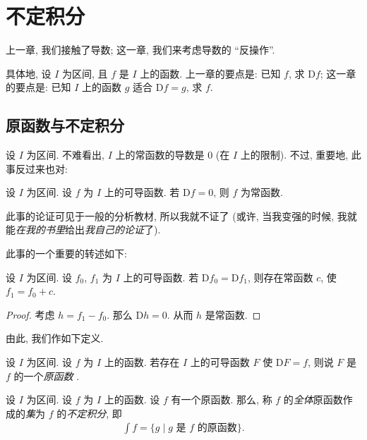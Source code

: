 \chapter{不定积分}

上一章, 我们接触了导数;
这一章, 我们来考虑导数的 ``反操作''.

具体地, 设 $I$ 为区间, 且 $f$ 是 $I$ 上的函数.
上一章的要点是:
已知 $f$, 求 $\mathrm{D}f$;
这一章的要点是:
已知 $I$ 上的函数 $g$ 适合 $\mathrm{D}f = g$, 求 $f$.

\section{原函数与不定积分}

设 $I$ 为区间.
不难看出, $I$ 上的常函数的导数是 $0$ (在 $I$ 上的限制).
不过, 重要地, 此事反过来也对:

\begin{theorem}
    设 $I$ 为区间.
    设 $f$ 为 $I$ 上的可导函数.
    若 $\mathrm{D}f = 0$, 则 $f$ 为常函数.
\end{theorem}

此事的论证可见于一般的分析教材, 所以我就不证了
(或许, 当我变强的时候,
我就能\emph{在我的书里}给出\emph{我自己的论证}了).

此事的一个重要的转述如下:

\begin{theorem}
    设 $I$ 为区间.
    设 $f_0$, $f_1$ 为 $I$ 上的可导函数.
    若 $\mathrm{D}{f_0} = \mathrm{D}{f_1}$,
    则存在常函数 $c$, 使 $f_1 = f_0 + c$.
\end{theorem}

\begin{proof}
    考虑 $h = f_1 - f_0$.
    那么 $\mathrm{D}h = 0$.
    从而 $h$ 是常函数.
\end{proof}

由此, 我们作如下定义.

\begin{definition}
    设 $I$ 为区间.
    设 $f$ 为 $I$ 上的函数.
    若存在 $I$ 上的可导函数 $F$ 使 $\mathrm{D}F = f$,
    则说 $F$ 是 $f$ 的一个\emph{原函数}%
    .
\end{definition}

\begin{definition}
    设 $I$ 为区间.
    设 $f$ 为 $I$ 上的函数.
    设 $f$ 有一个原函数.
    那么, 称 $f$ 的\emph{全体}原函数作成的\emph{集}为
    $f$ 的\emph{不定积分},
    即
    \begin{align*}
        \int {f} = \{ g \mid \text{$g$ 是 $f$ 的原函数} \}.
    \end{align*}
\end{definition}

